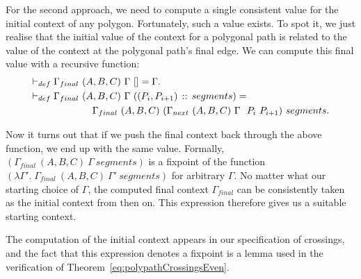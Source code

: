 For the second approach, we need to compute a single consistent value for the initial context of any polygon. Fortunately, such a value exists. To spot it, we just realise that the initial value of the context for a polygonal path is related to the value of the context at the polygonal path's final edge. We can compute this final value with a recursive function:
\begin{equation*}
\begin{aligned}
\vdash_{def}\;&\Gamma_{final}\ (A,B,C)\ \Gamma\ [] = \Gamma.\\
\vdash_{def}\;&\Gamma_{final}\ (A,B,C)\ \Gamma\ ((P_i,P_{i+1})\,::\,segments) = \\
&\qquad\qquad\Gamma_{final}\ (A,B,C)\ (\Gamma_{next}\ (A,B,C)\ \Gamma\ \ P_i\ P_{i+1})\ segments.
\end{aligned}
\end{equation*}

Now it turns out that if we push the final context back through the above function, we end up with the same value. Formally, $(\Gamma_{final}\ (A,B,C)\ \Gamma\ segments)$ is a fixpoint of the function $(\lambda \Gamma'.\; \Gamma_{final}\ (A,B,C)\ \Gamma'\ segments)$ for arbitrary $\Gamma$. No matter what our starting choice of $\Gamma$, the computed final context $\Gamma_{final}$ can be consistently taken as the initial context from then on. This expression therefore gives us a suitable starting context.

The computation of the initial context appears in our specification of crossings, and the fact that this expression denotes a fixpoint is a lemma used in the verification of Theorem~\ref{eq:polypathCrossingsEven}.

